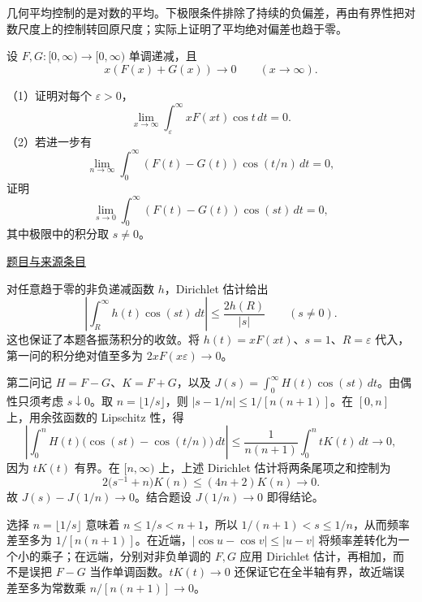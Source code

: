 \documentclass[12pt,fontset=fandol]{ctexart}
\begin{document}
\begin{remark}[方法与条件]几何平均控制的是对数的平均。下极限条件排除了持续的负偏差，再由有界性把对数尺度上的控制转回原尺度；实际上证明了平均绝对偏差也趋于零。\end{remark}

\begin{example}[来源序号7]\label{ex:fin03-all:7}\label{pr:fin03-all:7}

设 $F,G:[0,\infty)\to[0,\infty)$ 单调递减，且
\[
x(F(x)+G(x))\longrightarrow0\qquad(x\to\infty).
\]

（1）证明对每个 $\varepsilon>0$，
\[
\lim_{x\to\infty}\int_\varepsilon^\infty xF(xt)\cos t\,dt=0.
\]
（2）若进一步有
\[
\lim_{n\to\infty}\int_0^\infty(F(t)-G(t))\cos(t/n)\,dt=0,
\]
证明
\[
\lim_{s\to0}\int_0^\infty(F(t)-G(t))\cos(st)\,dt=0,
\]
其中极限中的积分取 $s\ne0$。

\par\href{https://github.com/lzxcr/cmc-mathematics/blob/64916fa1fdbc3e444a652eca204d5669058ee321/src/problems/finals/03/07.md}{题目与来源条目}

\end{example}

\begin{solve}\label{ans:fin03-all:7}

对任意趋于零的非负递减函数 $h$，Dirichlet 估计给出
\[
\left|\int_R^\infty h(t)\cos(st)\,dt\right|
\le\frac{2h(R)}{|s|}\qquad(s\ne0).
\]
这也保证了本题各振荡积分的收敛。将 $h(t)=xF(xt)$、$s=1$、$R=\varepsilon$ 代入，第一问的积分绝对值至多为
$2xF(x\varepsilon)\to0$。

第二问记 $H=F-G$、$K=F+G$，以及
$J(s)=\int_0^\infty H(t)\cos(st)\,dt$。由偶性只须考虑 $s\downarrow0$。取 $n=\lfloor1/s\rfloor$，则
$|s-1/n|\le1/[n(n+1)]$。在 $[0,n]$ 上，用余弦函数的 Lipschitz 性，得
\[
\left|\int_0^nH(t)\bigl(\cos(st)-\cos(t/n)\bigr)\,dt\right|
\le\frac1{n(n+1)}\int_0^n tK(t)\,dt\longrightarrow0,
\]
因为 $tK(t)$ 有界。在 $[n,\infty)$ 上，上述 Dirichlet 估计将两条尾项之和控制为
\[
2\bigl(s^{-1}+n\bigr)K(n)\le(4n+2)K(n)\longrightarrow0.
\]
故 $J(s)-J(1/n)\to0$。结合题设 $J(1/n)\to0$ 即得结论。

选择 $n=\lfloor1/s\rfloor$ 意味着 $n\le1/s<n+1$，所以 $1/(n+1)<s\le1/n$，从而频率差至多为 $1/[n(n+1)]$。在近端，$|\cos u-\cos v|\le|u-v|$ 将频率差转化为一个小的乘子；在远端，分别对非负单调的 $F,G$ 应用 Dirichlet 估计，再相加，而不是误把 $F-G$ 当作单调函数。$tK(t)\to0$ 还保证它在全半轴有界，故近端误差至多为常数乘 $n/[n(n+1)]\to0$。

\end{solve}
\end{document}

